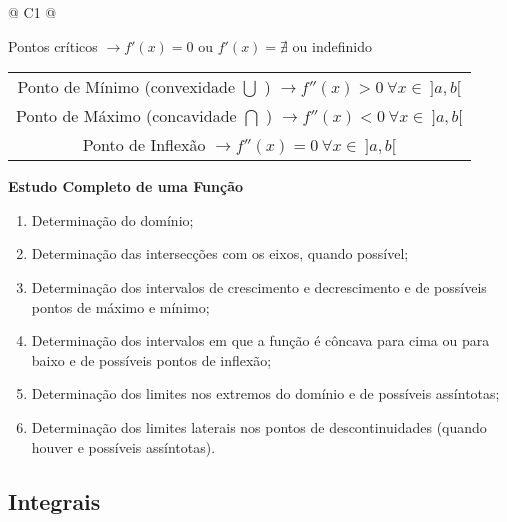 		\begin{longtable}{
		@{}
		C{1\textwidth} 
		@{}}

			\toprule
			{\large Pontos críticos $\rightarrow f'(x) = 0$ ou $f'(x) = \nexists$ ou indefinido}
			\tabularnewline
			\midrule
			{\large \begin{tabular}[c]{@{}c@{}} Ponto de Mínimo (convexidade $\bigcup$ ) $\rightarrow f''(x) > 0 \ \forall x \in \ ]a, b[$ \\ Ponto de Máximo (concavidade $\bigcap$ ) $\rightarrow f''(x) < 0 \ \forall x \in \ ]a, b[$ \\ Ponto de Inflexão $\rightarrow f''(x) = 0 \ \forall x \in \ ]a, b[$ \end{tabular}}
			\tabularnewline
			\midrule
			\textbf{Estudo Completo de uma Função}
			\tabularnewline
			\midrule
			{\large \begin{enumerate}[label=(\arabic*)] \item Determinação do domínio; \item Determinação das intersecções com os eixos, quando possível; \item Determinação dos intervalos de crescimento e decrescimento e de possíveis pontos de máximo e mínimo; \item Determinação dos intervalos em que a função é côncava para cima ou para baixo e de possíveis pontos de inflexão; \item Determinação dos limites nos extremos do domínio e de possíveis assíntotas; \item Determinação dos limites laterais nos pontos de descontinuidades (quando houver e possíveis assíntotas). \end{enumerate}}
			\tabularnewline
			\bottomrule

		\end{longtable}
		
	\subsection{Integrais}

